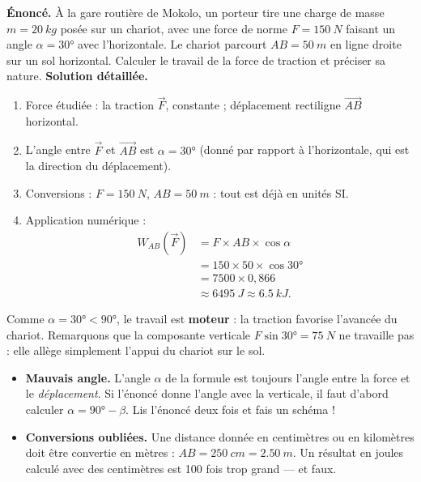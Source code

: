 \documentclass[11pt]{article}
\begin{document}
\begin{exoresolu}
\textbf{Énoncé.} À la gare routière de Mokolo, un porteur tire une charge de masse $m = \SI{20}{kg}$ posée sur un chariot, avec une force de norme $F = \SI{150}{N}$ faisant un angle $\alpha = 30°$ avec l'horizontale. Le chariot parcourt $AB = \SI{50}{m}$ en ligne droite sur un sol horizontal. Calculer le travail de la force de traction et préciser sa nature.
\tcblower
\textbf{Solution détaillée.}
\begin{enumerate}
\item Force étudiée : la traction $\vec{F}$, constante ; déplacement rectiligne $\overrightarrow{AB}$ horizontal.
\item L'angle entre $\vec{F}$ et $\overrightarrow{AB}$ est $\alpha = 30°$ (donné par rapport à l'horizontale, qui est la direction du déplacement).
\item Conversions : $F = \SI{150}{N}$, $AB = \SI{50}{m}$ : tout est déjà en unités SI.
\item Application numérique :
\begin{align*}
W_{AB}(\vec{F}) &= F \times AB \times \cos\alpha \\
&= 150 \times 50 \times \cos 30° \\
&= 7500 \times 0{,}866 \\
&\approx \SI{6495}{J} \approx \SI{6,5}{kJ}.
\end{align*}
\end{enumerate}
Comme $\alpha = 30° < 90°$, le travail est \textbf{moteur} : la traction favorise l'avancée du chariot. Remarquons que la composante verticale $F\sin 30° = \SI{75}{N}$ ne travaille pas : elle allège simplement l'appui du chariot sur le sol.
\end{exoresolu}

\begin{attention}
\begin{itemize}
\item \textbf{Mauvais angle.} L'angle $\alpha$ de la formule est toujours l'angle entre la force et le \emph{déplacement}. Si l'énoncé donne l'angle avec la verticale, il faut d'abord calculer $\alpha = 90° - \beta$. Lis l'énoncé deux fois et fais un schéma !
\item \textbf{Conversions oubliées.} Une distance donnée en centimètres ou en kilomètres doit être convertie en mètres : $AB = \SI{250}{cm} = \SI{2,50}{m}$. Un résultat en joules calculé avec des centimètres est 100 fois trop grand — et faux.
\end{itemize}
\end{attention}
\end{document}
